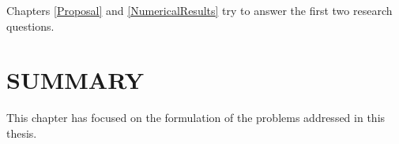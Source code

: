 Chapters \ref{Proposal} and \ref{NumericalResults} try to answer the first two research questions.

\section{SUMMARY} \label{sec:PF4}

This chapter has focused on the formulation of the problems addressed in this thesis. %